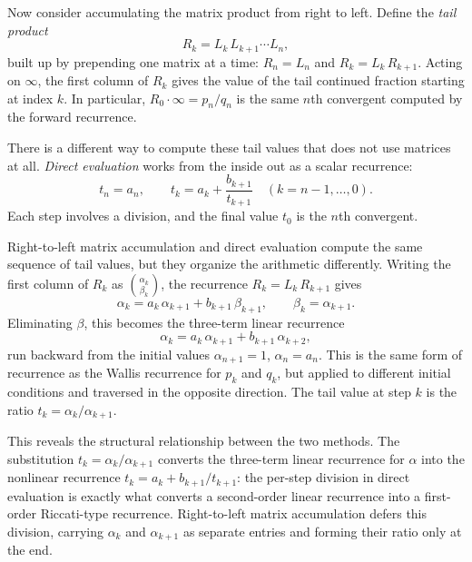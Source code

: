 \documentclass{article}
\begin{document}
Now consider accumulating the matrix product from right to left. Define the \emph{tail product}
\begin{equation}
  R_k = L_k\, L_{k+1} \cdots L_n,
\end{equation}
built up by prepending one matrix at a time: $R_n = L_n$ and $R_k = L_k\, R_{k+1}$. Acting on $\infty$, the first column of $R_k$ gives the value of the tail continued fraction starting at index $k$. In particular, $R_0 \cdot \infty = p_n/q_n$ is the same $n$th convergent computed by the forward recurrence.

There is a different way to compute these tail values that does not use matrices at all. \emph{Direct evaluation} works from the inside out as a scalar recurrence:
\begin{equation}
  t_n = a_n, \qquad t_k = a_k + \frac{b_{k+1}}{t_{k+1}} \quad (k = n{-}1, \ldots, 0).
\end{equation}
Each step involves a division, and the final value $t_0$ is the $n$th convergent.

Right-to-left matrix accumulation and direct evaluation compute the same sequence of tail values, but they organize the arithmetic differently. Writing the first column of $R_k$ as $\binom{\alpha_k}{\beta_k}$, the recurrence $R_k = L_k\, R_{k+1}$ gives
\begin{equation}
  \alpha_k = a_k\,\alpha_{k+1} + b_{k+1}\,\beta_{k+1}, \qquad \beta_k = \alpha_{k+1}.
\end{equation}
Eliminating $\beta$, this becomes the three-term linear recurrence
\begin{equation}
  \alpha_k = a_k\,\alpha_{k+1} + b_{k+1}\,\alpha_{k+2},
\end{equation}
run backward from the initial values $\alpha_{n+1} = 1$, $\alpha_n = a_n$. This is the same form of recurrence as the Wallis recurrence for $p_k$ and $q_k$, but applied to different initial conditions and traversed in the opposite direction. The tail value at step $k$ is the ratio $t_k = \alpha_k / \alpha_{k+1}$.

This reveals the structural relationship between the two methods. The substitution $t_k = \alpha_k / \alpha_{k+1}$ converts the three-term linear recurrence for $\alpha$ into the nonlinear recurrence $t_k = a_k + b_{k+1}/t_{k+1}$: the per-step division in direct evaluation is exactly what converts a second-order linear recurrence into a first-order Riccati-type recurrence. Right-to-left matrix accumulation defers this division, carrying $\alpha_k$ and $\alpha_{k+1}$ as separate entries and forming their ratio only at the end.
\end{document}
